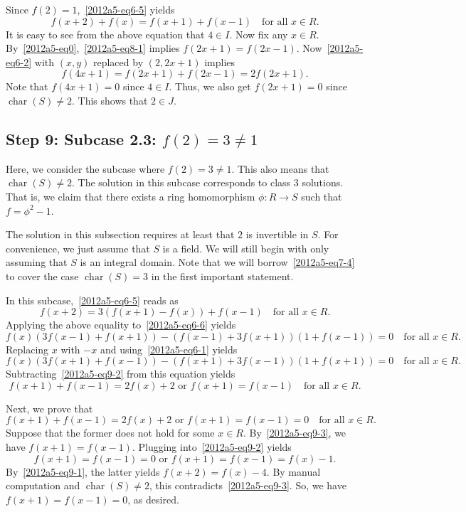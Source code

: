 \documentclass{article}
\DeclareMathOperator{\rchar}{char}
\begin{document}
Since $f(2) = 1$,~\eqref{2012a5-eq6-5} yields
\[ f(x + 2) + f(x) = f(x + 1) + f(x - 1) \quad \text{for all } x \in R. \tag{8.1}\label{2012a5-eq8-1} \]
It is easy to see from the above equation that $4 \in I$.
Now fix any $x \in R$.
By~\eqref{2012a5-eq0},~\eqref{2012a5-eq8-1} implies $f(2x + 1) = f(2x - 1)$.
Now~\eqref{2012a5-eq6-2} with $(x, y)$ replaced by $(2, 2x + 1)$ implies
\[ f(4x + 1) = f(2x + 1) + f(2x - 1) = 2 f(2x + 1). \]
Note that $f(4x + 1) = 0$ since $4 \in I$.
Thus, we also get $f(2x + 1) = 0$ since $\rchar(S) \neq 2$.
This shows that $2 \in J$.









\subsection*{Step 9: Subcase 2.3: $f(2) = 3 \neq 1$}

Here, we consider the subcase where $f(2) = 3 \neq 1$.
This also means that $\rchar(S) \neq 2$.
The solution in this subcase corresponds to class 3 solutions.
That is, we claim that there exists a ring homomorphism $\phi : R \to S$ such that $f = \phi^2 - 1$.

The solution in this subsection requires at least that $2$ is invertible in $S$.
For convenience, we just assume that $S$ is a field.
We will still begin with only assuming that $S$ is an integral domain.
Note that we will borrow~\eqref{2012a5-eq7-4} to cover the case $\rchar(S) = 3$ in the first important statement.

In this subcase,~\eqref{2012a5-eq6-5} reads as
\[ f(x + 2) = 3 (f(x + 1) - f(x)) + f(x - 1) \quad \text{for all } x \in R. \tag{9.1}\label{2012a5-eq9-1} \]
Applying the above equality to~\eqref{2012a5-eq6-6} yields
\[ f(x) (3 f(x - 1) + f(x + 1)) - (f(x - 1) + 3 f(x + 1)) (1 + f (x - 1)) = 0 \quad \text{for all } x \in R. \tag{9.2}\label{2012a5-eq9-2} \]
Replacing $x$ with $-x$ and using~\eqref{2012a5-eq6-1} yields
\[ f(x) (3 f(x + 1) + f(x - 1)) - (f(x + 1) + 3 f(x - 1)) (1 + f (x + 1)) = 0 \quad \text{for all } x \in R. \]
Subtracting~\eqref{2012a5-eq9-2} from this equation yields
\[ f(x + 1) + f(x - 1) = 2 f(x) + 2 \text{ or } f(x + 1) = f(x - 1) \quad \text{for all } x \in R. \tag{9.3}\label{2012a5-eq9-3} \]

Next, we prove that
\[ f(x + 1) + f(x - 1) = 2 f(x) + 2 \text{ or } f(x + 1) = f(x - 1) = 0 \quad \text{for all } x \in R. \tag{9.4}\label{2012a5-eq9-4} \]
Suppose that the former does not hold for some $x \in R$.
By~\eqref{2012a5-eq9-3}, we have $f(x + 1) = f(x - 1)$.
Plugging into~\eqref{2012a5-eq9-2} yields
\[ f(x + 1) = f(x - 1) = 0 \text{ or } f(x + 1) = f(x - 1) = f(x) - 1. \]
By~\eqref{2012a5-eq9-1}, the latter yields $f(x + 2) = f(x) - 4$.
By manual computation and $\rchar(S) \neq 2$, this contradicts~\eqref{2012a5-eq9-3}.
So, we have $f(x + 1) = f(x - 1) = 0$, as desired.
\end{document}

